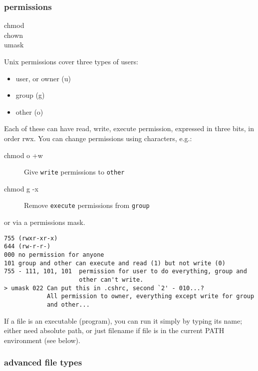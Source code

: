 \documentclass{article}
\begin{document}
\subsubsection{permissions}
\begin{description}
    \item [chmod]
    \item [chown]
    \item [umask]
\end{description}
Unix permissions cover three types of users:
\begin{itemize}
    \item user, or owner (u)
    \item group (g)
    \item other (o)
\end{itemize}
Each of these can have read,
write, execute permission, expressed in three bits, in order rwx. You
can change permissions using characters, e.g.:
\begin{description}
    \item [chmod o +w] Give \verb|write| permissions to \verb|other|
    \item [chmod g -x] Remove \verb|execute| permissions from \verb|group|
\end{description}
or via a permissions mask.
\begin{verbatim}
755 (rwxr-xr-x)
644 (rw-r-r-)
000 no permission for anyone
101 group and other can execute and read (1) but not write (0)
755 - 111, 101, 101  permission for user to do everything, group and
                     other can't write.
> umask 022 Can put this in .cshrc, second `2' - 010...?
            All permission to owner, everything except write for group
            and other...
\end{verbatim}
If a file is an executable (program), you can run it simply by typing
its name; either need absolute path, or just filename if file is in
the current PATH environment (see below).

\subsubsection{advanced file types}
\end{document}
